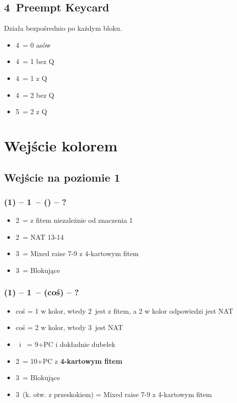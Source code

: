 \documentclass[12pt, a4paper]{article}
\newcommand*\link[1]{\hspace*{0em plus 1fill}\makebox{#1}}
\newcommand{\imp}{\color{BurntOrange}\link{\textbf{\large!}}\color{black}}
\newcommand{\vimp}{\color{OrangeRed}\link{\textbf{\large{!!}}}\color{black}}
\begin{document}
\subsection*{4\clubs\ Preempt Keycard \vimp} 
Działa bezpośrednio po każdym bloku.
\begin{itemize}
    \item 4\diams\ = 0 asów
    \item 4\hearts\ = 1 bez Q
    \item 4\spades\ = 1 z Q
    \item 4\nt\ = 2 bez Q
    \item 5\clubs\ = 2 z Q
\end{itemize}


\pagebreak
\section{Wejście kolorem}
\subsection*{Wejście na poziomie 1}
\subsubsection*{(1\clubs) -- 1\hearts\ -- (\passx) -- ?}
\begin{itemize}
    \item 2\clubs\ = z fitem niezależnie od znaczenia 1\clubs
    \item 2\nt\ = NAT 13-14 \imp
    \item 3\clubs\ = Mixed raise 7-9 z 4-kartowym fitem
    \item 3\hearts\ = Blokujące
\end{itemize}

\subsubsection*{(1\clubs) -- 1\hearts\ -- (coś) -- ?}
\begin{itemize}
    \item coś = 1 w kolor, wtedy 2\clubs\ jest z fitem, a 2 w kolor odpowiedzi jest NAT
    \item coś = 2 w kolor, wtedy 3\clubs\ jest NAT
    \item \dbl\ i \rdbl\ = 9+PC i dokładnie dubelek \hearts
    \item 2\nt\ = 10+PC z \textbf{4-kartowym fitem} \imp
    \item 3\hearts\ = Blokujące
    \item 3\clubs\ (k. otw. z przeskokiem) = Mixed raise 7-9 z 4-kartowym fitem
\end{itemize}
\end{document}
